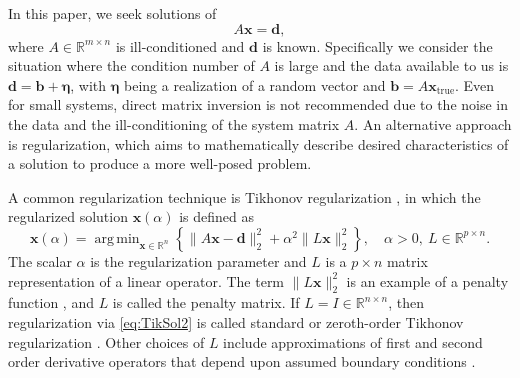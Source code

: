 \documentclass[12pt]{article}
\newcommand{\bVec}{\mathbf{b}}	%
\newcommand{\dVec}{\mathbf{d}}	%
\newcommand{\xVec}{\mathbf{x}}	%
\newcommand{\xTrue}{\mathbf{x}_{\text{true}}}	%
\newcommand{\regparam}{\alpha}  %
\newcommand{\xReg}{\xVec(\regparam)}	%
\DeclareMathOperator*{\argmin}{arg\,min}
\newcommand{\noise}{\eta}	%
\newcommand{\noiseVec}{\bm{\noise}}	%
\begin{document}
In this paper, we seek solutions of 
\begin{equation}
\label{eq:Ax = b}
A\xVec = \dVec,
\end{equation}
where $A \in \mathbb{R}^{m \times n}$ is ill-conditioned and $\dVec$ is known. Specifically we consider the situation where the condition number of $A$ is large and the data available to us is $\dVec = \bVec + \noiseVec$, with $\noiseVec$ being a realization of a random vector and $\bVec = A\xTrue$. Even for small systems, direct matrix inversion is not recommended due to the noise in the data and the ill-conditioning of the system matrix $A$. An alternative approach is regularization, which aims to mathematically describe desired characteristics of a solution to produce a more well-posed problem. \par
A common regularization technique is Tikhonov regularization \cite{Tikh1963}, in which the regularized solution $\xReg$ is defined as
\begin{equation}
\label{eq:TikSol2}
\xVec(\regparam) = \argmin_{\xVec \in \mathbb{R}^n} \left\{\|A\xVec - \dVec\|_2^2 + \regparam^2\|L\xVec\|_2^2\right\}, \quad \regparam > 0, ~ L \in \mathbb{R}^{p \times n}.
\end{equation}
The scalar $\regparam$ is the regularization parameter and $L$ is a $p \times n$ matrix representation of a linear operator. The term $\|L\xVec\|_2^2$ is an example of a penalty function \cite{Vogel:2002}, and $L$ is called the penalty matrix. If $L = I \in \mathbb{R}^{n \times n}$, then regularization via \eqref{eq:TikSol2} is called standard or zeroth-order Tikhonov regularization \cite{ABT}. Other choices of $L$ include approximations of first and second order derivative operators that depend upon assumed boundary conditions \cite{NeumannDCT,Strang1999,Vogel:2002}. \par 
\end{document}
